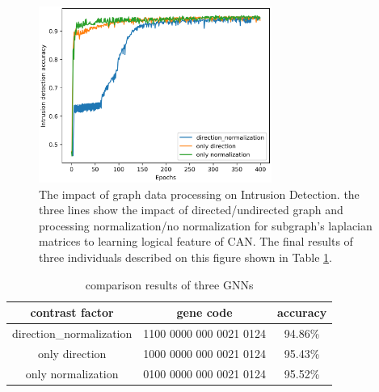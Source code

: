 \documentclass[lettersize,journal]{IEEEtran}
\begin{document}
\begin{figure}[!t]
\centering
\includegraphics[width=3in]{di_nor_01}
\caption{The impact of graph data processing on Intrusion Detection. the three lines show the impact of directed/undirected graph and processing normalization/no normalization for subgraph’s laplacian matrices to learning logical feature of CAN. The final results of three individuals described on this figure shown in Table \ref{table4}.}
\label{fig_11}
\end{figure}

\begin{table}[!t]
\caption{comparison results of three GNNs\label{table4}}
\centering
\begin{tabular}{ccc}
\hline
contrast factor & gene code & accuracy\\
\hline
direction\_normalization & 1100 0000 000 0021 0124 &  94.86\%\\
only direction & 1000 0000 000 0021 0124 & 95.43\%\\
only normalization & 0100 0000 000 0021 0124 & 95.52\%\\
\hline
\end{tabular}
\end{table}
\end{document}
